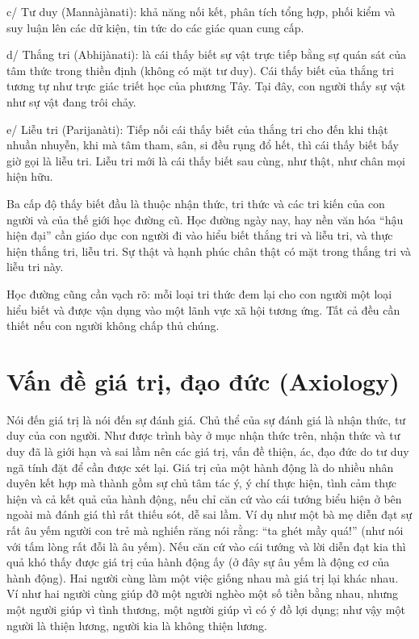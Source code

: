 c/ Tư duy (Mannàjànati): khả năng nối kết, phân tích tổng hợp, phối kiểm và suy luận lên các dữ kiện, tin tức do các giác quan cung cấp.

d/ Thắng tri (Abhijànati): là cái thấy biết sự vật trực tiếp bằng sự quán sát của tâm thức trong thiền định (không có mặt tư duy). Cái thấy biết của thắng tri tương tự như trực giác triết học của phương Tây. Tại đây, con người thấy sự vật như sự vật đang trôi chảy.

e/ Liễu tri (Parijanàti): Tiếp nối cái thấy biết của thắng tri cho đến khi thật nhuần nhuyễn, khi mà tâm tham, sân, si đều rụng đổ hết, thì cái thấy biết bấy giờ gọi là liễu tri. Liễu tri mới là cái thấy biết sau cùng, như thật, như chân mọi hiện hữu.

Ba cấp độ thấy biết đầu là thuộc nhận thức, tri thức và các tri kiến của con người và của thế giới học đường cũ. Học đường ngày nay, hay nền văn hóa ``hậu hiện đại'' cần giáo dục con người đi vào hiểu biết thắng tri và liễu tri, và thực hiện thắng tri, liễu tri. Sự thật và hạnh phúc chân thật có mặt trong thắng tri và liễu tri này.

Học đường cũng cần vạch rõ: mỗi loại tri thức đem lại cho con người một loại hiểu biết và được vận dụng vào một lãnh vực xã hội tương ứng. Tất cả đều cần thiết nếu con người không chấp thủ chúng.

\section{Vấn đề giá trị, đạo đức (Axiology)} %
\label{sec:van_de_gia_tri_dao_duc}

Nói đến giá trị là nói đến sự đánh giá. Chủ thể của sự đánh giá là nhận thức, tư duy của con người. Như được trình bày ở mục nhận thức trên, nhận thức và tư duy đã là giới hạn và sai lầm nên các giá trị, vấn đề thiện, ác, đạo đức do tư duy ngã tính đặt để cần được xét lại. Giá trị của một hành động là do nhiều nhân duyên kết hợp mà thành gồm sự chủ tâm tác ý, ý chí thực hiện, tình cảm thực hiện và cả kết quả của hành động, nếu chỉ căn cứ vào cái tướng biểu hiện ở bên ngoài mà đánh giá thì rất thiếu sót, dễ sai lầm. Ví dụ như một bà mẹ diễn đạt sự rất âu yếm người con trẻ mà nghiến răng nói rằng: ``ta ghét mầy quá!'' (như nói với tấm lòng rất đỗi là âu yếm). Nếu căn cứ vào cái tướng và lời diễn đạt kia thì quả khó thấy được giá trị của hành động ấy (ở đây sự âu yếm là động cơ của hành động). Hai người cùng làm một việc giống nhau mà giá trị lại khác nhau. Ví như hai người cùng giúp đỡ một người nghèo một số tiền bằng nhau, nhưng một người giúp vì tình thương, một người giúp vì có ý đồ lợi dụng; như vậy một người là thiện lương, người kia là không thiện lương.

